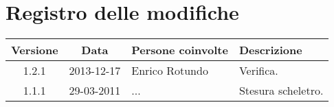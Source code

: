 \section*{Registro delle modifiche}

\begin{tabularx}{\textwidth}{|c|c|p{3.5cm}|X|}
 \hline \textbf{Versione} & \textbf{Data} & \textbf{Persone coinvolte} & \textbf{Descrizione} \\
 \hline 1.2.1 & 2013-12-17  & Enrico Rotundo & Verifica.\\
 \hline 1.1.1 & 29-03-2011 & ... & Stesura scheletro.\\ %
 \hline
\end{tabularx}
